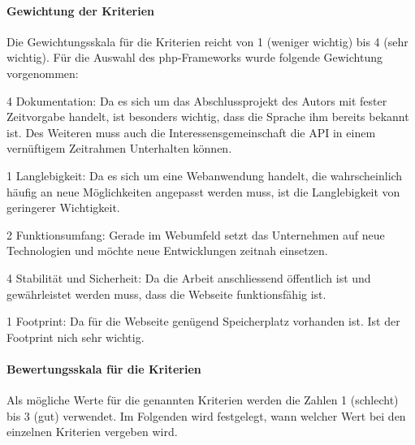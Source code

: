 \paragraph*{Gewichtung der Kriterien}
Die Gewichtungsskala für die Kriterien reicht von 1 (weniger wichtig) bis 4 (sehr wichtig). Für die Auswahl des php-Frameworks wurde folgende Gewichtung vorgenommen:

\begin{itemize*}

\item 4 Dokumentation: Da es sich um das Abschlussprojekt des Autors mit fester Zeitvorgabe handelt, ist besonders wichtig, dass die Sprache ihm bereits bekannt ist. Des Weiteren muss auch die Interessensgemeinschaft die API in einem vernüftigem Zeitrahmen Unterhalten können.

\item 1 Langlebigkeit: Da es sich um eine Webanwendung handelt, die wahrscheinlich häufig an neue Möglichkeiten angepasst werden muss, ist die Langlebigkeit von geringerer Wichtigkeit.

\item 2 Funktionsumfang: Gerade im Webumfeld setzt das Unternehmen auf neue Technologien und möchte neue Entwicklungen zeitnah einsetzen.

\item 4 Stabilität und Sicherheit: Da die Arbeit anschliessend öffentlich ist und gewährleistet werden muss, dass die Webseite funktionsfähig ist.

\item 1 Footprint: Da für die Webseite genügend Speicherplatz vorhanden ist. Ist der Footprint nich sehr wichtig.



\end{itemize*}




\paragraph*{Bewertungsskala für die Kriterien}

Als mögliche Werte für die genannten Kriterien werden die Zahlen 1 (schlecht) bis 3 (gut) verwendet. Im Folgenden wird festgelegt, wann welcher Wert bei den einzelnen Kriterien vergeben wird.


